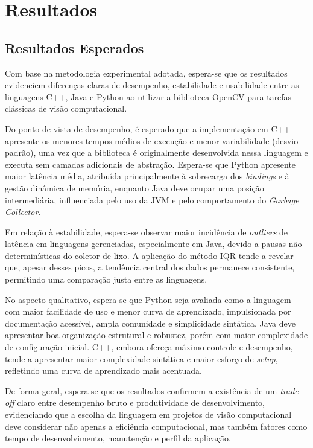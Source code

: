
\section{Resultados}

\subsection{Resultados Esperados}

Com base na metodologia experimental adotada, espera-se que os resultados evidenciem diferenças claras de desempenho, estabilidade e usabilidade entre as linguagens C++, Java e Python ao utilizar a biblioteca OpenCV para tarefas clássicas de visão computacional.

Do ponto de vista de desempenho, é esperado que a implementação em C++ apresente os menores tempos médios de execução e menor variabilidade (desvio padrão), uma vez que a biblioteca é originalmente desenvolvida nessa linguagem e executa sem camadas adicionais de abstração. Espera-se que Python apresente maior latência média, atribuída principalmente à sobrecarga dos \textit{bindings} e à gestão dinâmica de memória, enquanto Java deve ocupar uma posição intermediária, influenciada pelo uso da JVM e pelo comportamento do \textit{Garbage Collector}.

Em relação à estabilidade, espera-se observar maior incidência de \textit{outliers} de latência em linguagens gerenciadas, especialmente em Java, devido a pausas não determinísticas do coletor de lixo. A aplicação do método IQR tende a revelar que, apesar desses picos, a tendência central dos dados permanece consistente, permitindo uma comparação justa entre as linguagens.

No aspecto qualitativo, espera-se que Python seja avaliada como a linguagem com maior facilidade de uso e menor curva de aprendizado, impulsionada por documentação acessível, ampla comunidade e simplicidade sintática. Java deve apresentar boa organização estrutural e robustez, porém com maior complexidade de configuração inicial. C++, embora ofereça máximo controle e desempenho, tende a apresentar maior complexidade sintática e maior esforço de \textit{setup}, refletindo uma curva de aprendizado mais acentuada.

De forma geral, espera-se que os resultados confirmem a existência de um \textit{trade-off} claro entre desempenho bruto e produtividade de desenvolvimento, evidenciando que a escolha da linguagem em projetos de visão computacional deve considerar não apenas a eficiência computacional, mas também fatores como tempo de desenvolvimento, manutenção e perfil da aplicação.

